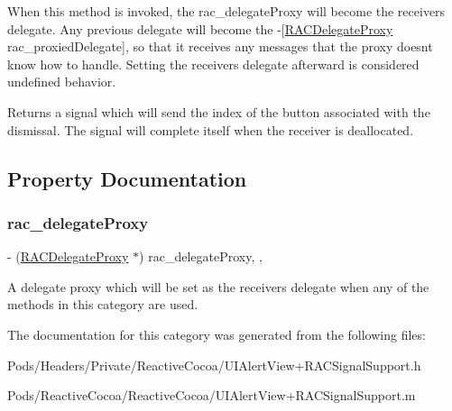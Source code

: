 When this method is invoked, the {\ttfamily rac\+\_\+delegate\+Proxy} will become the receiver\textquotesingle{}s delegate. Any previous delegate will become the -\/\mbox{[}\mbox{\hyperlink{interface_r_a_c_delegate_proxy}{R\+A\+C\+Delegate\+Proxy}} rac\+\_\+proxied\+Delegate\mbox{]}, so that it receives any messages that the proxy doesn\textquotesingle{}t know how to handle. Setting the receiver\textquotesingle{}s {\ttfamily delegate} afterward is considered undefined behavior.

Returns a signal which will send the index of the button associated with the dismissal. The signal will complete itself when the receiver is deallocated. 

\subsection{Property Documentation}
\mbox{\label{category_u_i_alert_view_07_r_a_c_signal_support_08_ae9b1bde4434c5912958337650d7aff85}} 
\subsubsection{\texorpdfstring{rac\+\_\+delegate\+Proxy}{rac\_delegateProxy}}
{\footnotesize\ttfamily -\/ (\mbox{\hyperlink{interface_r_a_c_delegate_proxy}{R\+A\+C\+Delegate\+Proxy}} $\ast$) rac\+\_\+delegate\+Proxy\hspace{0.3cm}{\ttfamily [read]}, {\ttfamily [nonatomic]}, {\ttfamily [strong]}}

A delegate proxy which will be set as the receiver\textquotesingle{}s delegate when any of the methods in this category are used. 

The documentation for this category was generated from the following files\+:\begin{DoxyCompactItemize}
\item 
Pods/\+Headers/\+Private/\+Reactive\+Cocoa/U\+I\+Alert\+View+\+R\+A\+C\+Signal\+Support.\+h\item 
Pods/\+Reactive\+Cocoa/\+Reactive\+Cocoa/U\+I\+Alert\+View+\+R\+A\+C\+Signal\+Support.\+m\end{DoxyCompactItemize}
